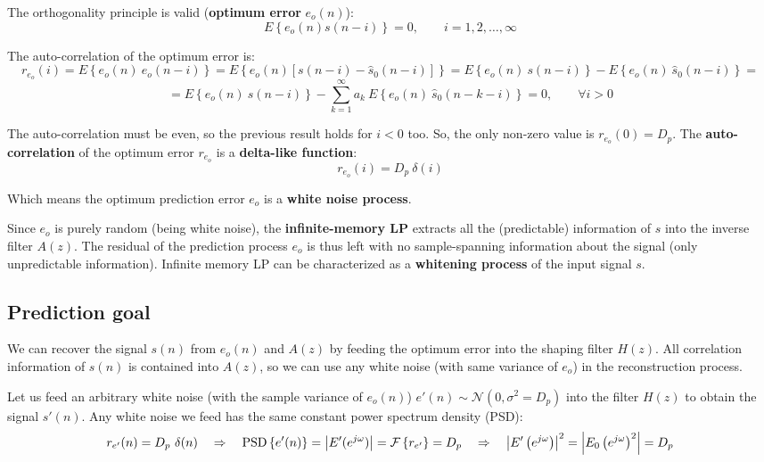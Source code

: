The orthogonality principle is valid (\textbf{optimum error} $e_o(n)$):
\[ E \left\{ e_o(n) s(n-i) \right\} = 0, \qquad i = 1, 2, \dots, \infty \]

The auto-correlation of the optimum error is:
\[ r_{e_o} (i) = E \left\{ e_o(n) \ e_o(n-i) \right\} = E \left\{ e_o(n) \left[ s(n-i) - \hat{s}_0(n-i) \right] \right\} = E \left\{ e_o(n) \ s(n-i) \right\} - E \left\{ e_o(n) \ \hat{s}_0(n-i) \right\} = \]
\[ = E \left\{ e_o(n) \ s(n-i) \right\} - \sum_{k=1}^{\infty} a_k \ E \left\{ e_o(n) \ \hat{s}_0(n-k-i) \right\} = 0, \qquad \forall i>0 \]

The auto-correlation must be even, so the previous result holds for $i<0$ too.
So, the only non-zero value is $ r_{e_o}(0)= D_p $.
The \textbf{auto-correlation} of the optimum error $ r_{e_o} $ is a \textbf{delta-like function}:
\[ r_{e_o}(i) = D_p \ \delta(i) \]

Which means the optimum prediction error $ e_o $ is a \textbf{white noise process}.

Since $ e_o $ is purely random (being white noise), the \textbf{infinite-memory LP} extracts all the (predictable) information of $s$ into the inverse filter $A(z)$.
The residual of the prediction process $e_o$ is thus left with no sample-spanning information about the signal (only unpredictable information).
Infinite memory LP can be characterized as a \textbf{whitening process} of the input signal $s$.

\subsection{Prediction goal}

We can recover the signal $ s(n) $ from $ e_o(n) $ and $ A(z) $ by feeding the optimum error into the shaping filter $ H(z) $.
All correlation information of $ s(n) $ is contained into $ A(z) $, so we can use any white noise (with same variance of $e_o$) in the reconstruction process.

Let us feed an arbitrary white noise (with the sample variance of $e_o(n)$) $ e'(n) \sim \mathcal{N}(0, \sigma^2 = D_p) $ into the filter $ H(z) $ to obtain the signal $ s'(n)$.
Any white noise we feed has the same constant power spectrum density (PSD):
\[ r_{e'}(n) = D_p \ \delta(n) \quad \Rightarrow \quad \text{PSD} \left\{e'(n)\right\} = \abs{E' (e^{j\omega})} = \mathcal{F} \left\{ r_{e'} \right\} = D_p  \quad \Rightarrow \quad \abs{E' \left( e^{j\omega} \right)}^2 = \abs{E_0 \left( e^{j\omega} \right)^2} = D_p \]

